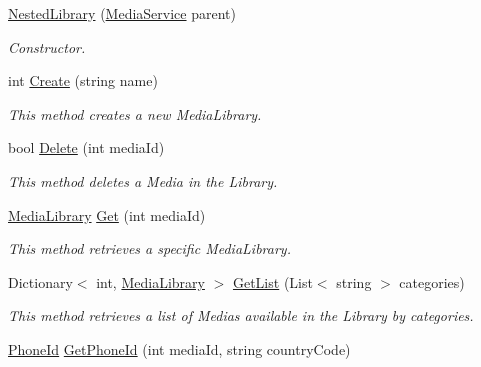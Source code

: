 \begin{DoxyCompactItemize}
\item 
\hyperlink{class_thecallr_api_1_1_services_1_1_client_1_1_media_service_1_1_nested_library_a5b71592adde74b2c74132e7d71ee9d93}{Nested\+Library} (\hyperlink{class_thecallr_api_1_1_services_1_1_client_1_1_media_service}{Media\+Service} parent)
\begin{DoxyCompactList}\small\item\em Constructor. \end{DoxyCompactList}\item 
int \hyperlink{class_thecallr_api_1_1_services_1_1_client_1_1_media_service_1_1_nested_library_a5d90c3c7c3ab20fbcf8f0e8803fa8b4c}{Create} (string name)
\begin{DoxyCompactList}\small\item\em This method creates a new Media\+Library. \end{DoxyCompactList}\item 
bool \hyperlink{class_thecallr_api_1_1_services_1_1_client_1_1_media_service_1_1_nested_library_a00f69412d0246a6a91d180a26f5859fe}{Delete} (int media\+Id)
\begin{DoxyCompactList}\small\item\em This method deletes a Media in the Library. \end{DoxyCompactList}\item 
\hyperlink{class_thecallr_api_1_1_objects_1_1_media_1_1_media_library}{Media\+Library} \hyperlink{class_thecallr_api_1_1_services_1_1_client_1_1_media_service_1_1_nested_library_ac49ba00b6e4a94777973c7f64490a414}{Get} (int media\+Id)
\begin{DoxyCompactList}\small\item\em This method retrieves a specific Media\+Library. \end{DoxyCompactList}\item 
Dictionary$<$ int, \hyperlink{class_thecallr_api_1_1_objects_1_1_media_1_1_media_library}{Media\+Library} $>$ \hyperlink{class_thecallr_api_1_1_services_1_1_client_1_1_media_service_1_1_nested_library_af441d2cdf0808d3395d1ee22fa2a5043}{Get\+List} (List$<$ string $>$ categories)
\begin{DoxyCompactList}\small\item\em This method retrieves a list of Medias available in the Library by categories. \end{DoxyCompactList}\item 
\hyperlink{class_thecallr_api_1_1_objects_1_1_media_1_1_phone_id}{Phone\+Id} \hyperlink{class_thecallr_api_1_1_services_1_1_client_1_1_media_service_1_1_nested_library_a0996deaa9a22cc7e8ae6a9919855435d}{Get\+Phone\+Id} (int media\+Id, string country\+Code)

\end{DoxyCompactItemize}
